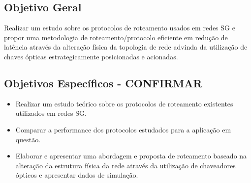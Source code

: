 \subsection{Objetivo Geral}
Realizar um estudo sobre os protocolos de roteamento usados em redes SG e propor uma metodologia de roteamento/protocolo eficiente em redução de latência através da alteração física da topologia de rede advinda da utilização de chaves ópticas estrategicamente posicionadas e acionadas.
\subsection{Objetivos Específicos - CONFIRMAR}
\begin{itemize}
	\item Realizar um estudo teórico sobre os protocolos de roteamento existentes utilizados em redes SG.
	\item Comparar a performance dos protocolos estudados para a aplicação em questão.
	\item Elaborar e apresentar uma abordagem e proposta de roteamento baseado na alteração da estrutura física da rede através da utilização de chaveadores ópticos e apresentar dados de simulação.
\end{itemize}